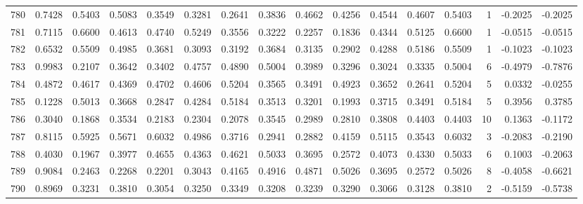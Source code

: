 \begin{tabular}{lrrrrrrrrrrrrrrr}
780 &      0.7428 &  0.5403 &  0.5083 &  0.3549 &  0.3281 &  0.2641 &  0.3836 &  0.4662 &  0.4256 &  0.4544 &   0.4607 &     0.5403 &      1 &                   -0.2025 &                    -0.2025 \\
781 &      0.7115 &  0.6600 &  0.4613 &  0.4740 &  0.5249 &  0.3556 &  0.3222 &  0.2257 &  0.1836 &  0.4344 &   0.5125 &     0.6600 &      1 &                   -0.0515 &                    -0.0515 \\
782 &      0.6532 &  0.5509 &  0.4985 &  0.3681 &  0.3093 &  0.3192 &  0.3684 &  0.3135 &  0.2902 &  0.4288 &   0.5186 &     0.5509 &      1 &                   -0.1023 &                    -0.1023 \\
783 &      0.9983 &  0.2107 &  0.3642 &  0.3402 &  0.4757 &  0.4890 &  0.5004 &  0.3989 &  0.3296 &  0.3024 &   0.3335 &     0.5004 &      6 &                   -0.4979 &                    -0.7876 \\
784 &      0.4872 &  0.4617 &  0.4369 &  0.4702 &  0.4606 &  0.5204 &  0.3565 &  0.3491 &  0.4923 &  0.3652 &   0.2641 &     0.5204 &      5 &                    0.0332 &                    -0.0255 \\
785 &      0.1228 &  0.5013 &  0.3668 &  0.2847 &  0.4284 &  0.5184 &  0.3513 &  0.3201 &  0.1993 &  0.3715 &   0.3491 &     0.5184 &      5 &                    0.3956 &                     0.3785 \\
786 &      0.3040 &  0.1868 &  0.3534 &  0.2183 &  0.2304 &  0.2078 &  0.3545 &  0.2989 &  0.2810 &  0.3808 &   0.4403 &     0.4403 &     10 &                    0.1363 &                    -0.1172 \\
787 &      0.8115 &  0.5925 &  0.5671 &  0.6032 &  0.4986 &  0.3716 &  0.2941 &  0.2882 &  0.4159 &  0.5115 &   0.3543 &     0.6032 &      3 &                   -0.2083 &                    -0.2190 \\
788 &      0.4030 &  0.1967 &  0.3977 &  0.4655 &  0.4363 &  0.4621 &  0.5033 &  0.3695 &  0.2572 &  0.4073 &   0.4330 &     0.5033 &      6 &                    0.1003 &                    -0.2063 \\
789 &      0.9084 &  0.2463 &  0.2268 &  0.2201 &  0.3043 &  0.4165 &  0.4916 &  0.4871 &  0.5026 &  0.3695 &   0.2572 &     0.5026 &      8 &                   -0.4058 &                    -0.6621 \\
790 &      0.8969 &  0.3231 &  0.3810 &  0.3054 &  0.3250 &  0.3349 &  0.3208 &  0.3239 &  0.3290 &  0.3066 &   0.3128 &     0.3810 &      2 &                   -0.5159 &                    -0.5738 \\

\end{tabular}
